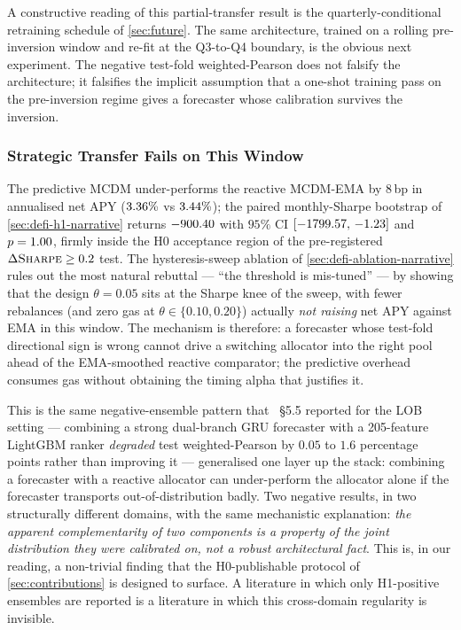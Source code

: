 A constructive reading of this partial-transfer result is the
quarterly-conditional retraining schedule of \cref{sec:future}.
The same architecture, trained on a rolling pre-inversion window
and re-fit at the Q3-to-Q4 boundary, is the obvious next
experiment. The negative test-fold weighted-Pearson does not
falsify the architecture; it falsifies the implicit assumption
that a one-shot training pass on the pre-inversion regime gives a
forecaster whose calibration survives the inversion.

\subsubsection{Strategic Transfer Fails on This Window}
\label{sec:disc-strat}

The predictive MCDM under-performs the reactive MCDM-EMA by
$8$\,bp in annualised net APY ($3.36\%{}$ vs
$3.44\%{}$); the paired monthly-Sharpe bootstrap of
\cref{sec:defi-h1-narrative} returns $-900.40{}$ with $95\%$
CI $[-1799.57{},\,-1.23{}]$ and
$p=1.00{}$, firmly inside the H0 acceptance region of
the pre-registered $\Delta\textsc{Sharpe}\ge 0.2$ test. The
hysteresis-sweep ablation of \cref{sec:defi-ablation-narrative}
rules out the most natural rebuttal --- ``the threshold is
mis-tuned'' --- by showing that the design $\theta=0.05$ sits at
the Sharpe knee of the sweep, with fewer rebalances (and zero
gas at $\theta\in\{0.10,0.20\}$) actually \emph{not raising} net
APY against EMA in this window. The mechanism is therefore: a
forecaster whose test-fold directional sign is wrong cannot drive
a switching allocator into the right pool ahead of the
EMA-smoothed reactive comparator; the predictive overhead consumes
gas without obtaining the timing alpha that justifies it.

This is the same negative-ensemble pattern that
\cite{solovev2026lob}~\S5.5 reported for the LOB setting ---
combining a strong dual-branch GRU forecaster with a 205-feature
LightGBM ranker \emph{degraded} test weighted-Pearson by $0.05$ to
$1.6$ percentage points rather than improving it --- generalised
one layer up the stack: combining a forecaster with a reactive
allocator can under-perform the allocator alone if the forecaster
transports out-of-distribution badly. Two negative results, in two
structurally different domains, with the same mechanistic
explanation: \emph{the apparent complementarity of two components
is a property of the joint distribution they were calibrated on,
not a robust architectural fact}. This is, in our reading, a
non-trivial finding that the H0-publishable protocol of
\cref{sec:contributions} is designed to surface. A literature in
which only H1-positive ensembles are reported is a literature in
which this cross-domain regularity is invisible.

